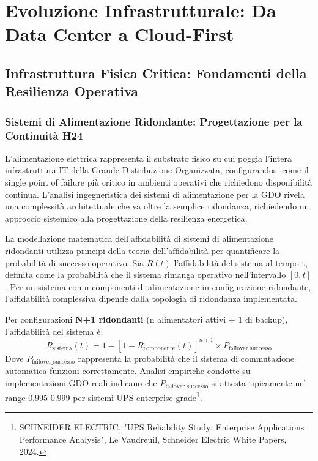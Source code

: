 
\chapter{Evoluzione Infrastrutturale: Da Data Center a Cloud-First}
\label{chap:evoluzione_infrastrutturale}

\section{Infrastruttura Fisica Critica: Fondamenti della Resilienza Operativa}
\label{sec:infrastruttura_fisica}

\subsection{Sistemi di Alimentazione Ridondante: Progettazione per la Continuità H24}
\label{ssec:alimentazione_ridondante}

L'alimentazione elettrica rappresenta il substrato fisico su cui poggia l'intera infrastruttura IT della Grande Distribuzione Organizzata, configurandosi come il single point of failure più critico in ambienti operativi che richiedono disponibilità continua. L'analisi ingegneristica dei sistemi di alimentazione per la GDO rivela una complessità architettuale che va oltre la semplice ridondanza, richiedendo un approccio sistemico alla progettazione della resilienza energetica.

La modellazione matematica dell'affidabilità di sistemi di alimentazione ridondanti utilizza principi della teoria dell'affidabilità per quantificare la probabilità di successo operativo. Sia $R(t)$ l'affidabilità del sistema al tempo t, definita come la probabilità che il sistema rimanga operativo nell'intervallo $[0,t]$. Per un sistema con n componenti di alimentazione in configurazione ridondante, l'affidabilità complessiva dipende dalla topologia di ridondanza implementata.

Per configurazioni \textbf{N+1 ridondanti} (n alimentatori attivi + 1 di backup), l'affidabilità del sistema è:
\[ R_{\text{sistema}}(t) = 1 - [1 - R_{\text{componente}}(t)]^{n+1} \times P_{\text{failover\_successo}} \]
Dove $P_{\text{failover\_successo}}$ rappresenta la probabilità che il sistema di commutazione automatica funzioni correttamente. Analisi empiriche condotte su implementazioni GDO reali indicano che $P_{\text{failover\_successo}}$ si attesta tipicamente nel range 0.995-0.999 per sistemi UPS enterprise-grade\footnote{SCHNEIDER ELECTRIC, "UPS Reliability Study: Enterprise Applications Performance Analysis", Le Vaudreuil, Schneider Electric White Papers, 2024.}.

